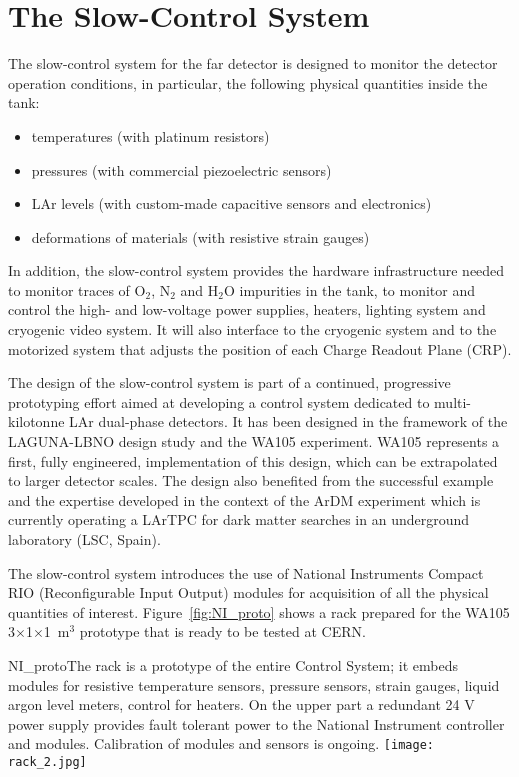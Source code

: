 \section{The Slow-Control System} 
\label{sec:detectors-fd-alt-dcs}

The slow-control system for the far detector is designed  to
monitor the detector operation conditions, in particular, the following physical
quantities inside the tank:
\begin{itemize}
 \item temperatures (with platinum resistors)
 \item pressures (with commercial piezoelectric sensors)
 \item LAr levels (with custom-made capacitive sensors and electronics)
 \item deformations of materials (with resistive strain gauges)
\end{itemize} 

In addition, the slow-control system provides the hardware
infrastructure needed to monitor traces of O$_2$, N$_2$ and H$_2$O
impurities in the tank, to monitor and control the high- and
low-voltage power supplies, heaters, lighting system and cryogenic
video system. It will also interface to the cryogenic system and to
the motorized system that adjusts the position of each Charge Readout
Plane (CRP).


The design of the slow-control system is part of a
continued, progressive prototyping effort aimed at developing a
control system dedicated to multi-kilotonne LAr dual-phase detectors. It
has been designed in the framework of the LAGUNA-LBNO design study and
 the WA105 experiment. WA105 represents a first, fully engineered,
implementation of this design, which can be extrapolated to larger
detector scales. The design also benefited from the successful example
and the expertise developed in the context of the ArDM
experiment\cite{Badertscher:2013ygt} which is currently operating a
LArTPC for dark matter searches in an underground laboratory (LSC,
Spain).

The slow-control system introduces the use of National Instruments
Compact RIO (Reconfigurable Input Output) modules for acquisition of
all the physical quantities of interest.  Figure~\ref{fig:NI_proto}
shows a rack prepared for the WA105 3$\times$1$\times$1~m$^3$
prototype that is ready to be tested at CERN.
\begin{cdrfigure}{NI_proto}{The rack is a  prototype of the entire Control System; it  embeds modules for resistive 
temperature sensors, pressure  sensors, strain gauges, liquid argon level  meters, control for  heaters. On the upper part a redundant 24 V power supply 
provides fault tolerant power to the National Instrument controller and modules.  Calibration of modules and sensors is ongoing.}
\texttt{[image: rack\_2.jpg]}
\end{cdrfigure}



